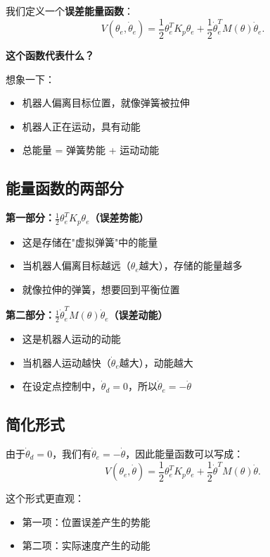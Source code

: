 \documentclass{article}
\begin{document}
我们定义一个\textbf{误差能量函数}：
\begin{equation}
V(\theta_e, \dot{\theta}_e) = \frac{1}{2}\theta_e^T K_p\theta_e + \frac{1}{2}\dot{\theta}_e^T M(\theta)\dot{\theta}_e. \tag{53}
\end{equation}

\textbf{这个函数代表什么？}

想象一下：
\begin{itemize}
\item 机器人偏离目标位置，就像弹簧被拉伸
\item 机器人正在运动，具有动能
\item 总能量 = 弹簧势能 + 运动动能
\end{itemize}

\subsection{能量函数的两部分}

\textbf{第一部分：$\frac{1}{2}\theta_e^T K_p\theta_e$（误差势能）}
\begin{itemize}
\item 这是存储在"虚拟弹簧"中的能量
\item 当机器人偏离目标越远（$\theta_e$越大），存储的能量越多
\item 就像拉伸的弹簧，想要回到平衡位置
\end{itemize}

\textbf{第二部分：$\frac{1}{2}\dot{\theta}_e^T M(\theta)\dot{\theta}_e$（误差动能）}
\begin{itemize}
\item 这是机器人运动的动能
\item 当机器人运动越快（$\dot{\theta}_e$越大），动能越大
\item 在设定点控制中，$\dot{\theta}_d = 0$，所以$\dot{\theta}_e = -\dot{\theta}$
\end{itemize}

\subsection{简化形式}

由于$\dot{\theta}_d = 0$，我们有$\dot{\theta}_e = -\dot{\theta}$，因此能量函数可以写成：
\begin{equation}
V(\theta_e, \dot{\theta}) = \frac{1}{2}\theta_e^T K_p\theta_e + \frac{1}{2}\dot{\theta}^T M(\theta)\dot{\theta}. \tag{54}
\end{equation}

这个形式更直观：
\begin{itemize}
\item 第一项：位置误差产生的势能
\item 第二项：实际速度产生的动能
\end{itemize}
\end{document}
